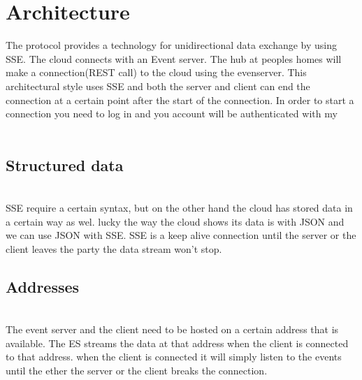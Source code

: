 \documentclass{article}
\begin{document}
\section{Architecture}\label{sec:architecture}
The protocol provides a technology for unidirectional data exchange by using SSE. The cloud connects with an Event server. The hub at peoples homes will make a connection(REST call) to the cloud using the evenserver. This architectural style uses SSE and both the server and client can end the connection at a certain point after the start of the connection.  In order to start a connection you need to log in and you account will be authenticated with my \\
\\
\subsection{Structured data}\label{sec:strucdata} \\
SSE require a certain syntax, but on the other hand the cloud has stored data in a certain way as wel. lucky the way the cloud shows its data is with JSON and we can use JSON with SSE. SSE is a keep alive connection until the server or the client leaves the party the data stream won't stop.\\

\subsection{Addresses}\label{sec:addresses} \\
The event server and the client need to be hosted on a certain address that is available. The ES streams the data at that address when the client is connected to that address. when the client is connected it will simply listen to the events until the ether the server or the client breaks the connection. \\

\cleardoublepage
\end{document}

